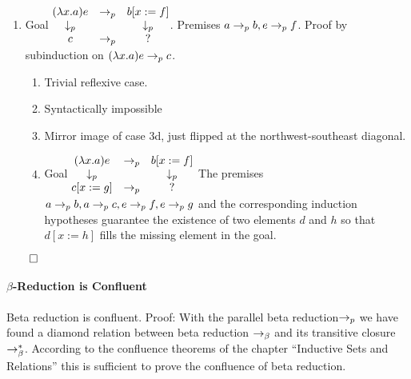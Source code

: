 \begin{theorem}
\begin{enumerate}
  \item
    Goal $\begin{matrix} (\lambda x.a) e & \to_p & b[x:=f] \\ \downarrow_p & & \downarrow_p \\ c & \to_p & ? \end{matrix}$. Premises $a \to_{p} b, e \to_{p} f$.
    Proof by subinduction on $(\lambda x.a) e \to_{p} c$.
    \begin{enumerate}
    \item Trivial reflexive case.
    \item Syntactically impossible
    \item Mirror image of case 3d, just flipped at the northwest-southeast diagonal.
    \item
      Goal $\begin{matrix} (\lambda x.a) e & \to_p & b[x:=f] \\ \downarrow_p & & \downarrow_p \\ c[x:=g] & \to_p & ? \end{matrix}$
      The premises $a \to_{p} b, a \to_{p} c, e \to_{p} f, e \to_{p} g$
      and the corresponding induction hypotheses guarantee the existence of
      two elements $d$ and $h$ so that $d[x:=h]$ fills the missing element
      in the goal.
    \end{enumerate}

  \end{enumerate}
  $\qed$
\end{theorem}

\paragraph{$\beta$-Reduction is Confluent}

\begin{theorem}
  Beta reduction is confluent.
  Proof: With the parallel beta reduction$\to_{p}$ we have found a diamond
  relation between beta reduction $\to_\beta$ and its transitive closure
  $\to^*_\beta$. According to the confluence theorems of the chapter
  ``Inductive Sets and Relations'' this is sufficient to prove the confluence
  of beta reduction.
\end{theorem}

